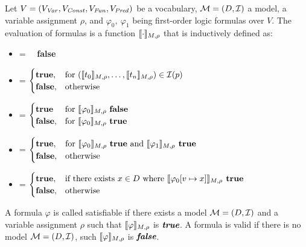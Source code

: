 \begin{mydef}
		Let $V = (V_{\mathit{Var}}, V_{\mathit{Const}}, V_{\mathit{Fun}}, V_{\mathit{Pred}})$ be a vocabulary, $\mathcal{M} = (D, \mathcal{I})$ a model, a variable assignment $\rho$, and $\varphi_0,\  \varphi_1$ being first-order logic formulas over $V$. The evaluation of formulas is a function $\llbracket \cdot \rrbracket_{M, \rho}$ that is inductively defined as: \\
		\begin{itemize}
			\item {\makebox[3.25cm]{$\eval{\bot} = \hfill$}} = \ \ \textbf{false}
			\item {} =
				$
				\begin{cases}
					\textbf{true}, & \text{for } (\llbracket t_0 \rrbracket_{M, \rho}, \ldots, \llbracket t_n \rrbracket_{M, \rho}) \in \mathcal{I}(p)\\
					\textbf{false}, & \text{otherwise}
				\end{cases}
				$
			\item {} =
				$
				\begin{cases}
					\textbf{true} & \text{for } \llbracket \varphi_0 \rrbracket_{M, \rho} \text{ \textbf{false}}\\
					\textbf{false}, & \text{for } \llbracket \varphi_0 \rrbracket_{M, \rho} \text{ \textbf{true}}\\
				\end{cases}
				$
			\item {} =
				$
				\begin{cases}
					\textbf{true}, & \text{for } \llbracket \varphi_0 \rrbracket_{M, \rho} \text{ \textbf{true} and } \llbracket \varphi_1 \rrbracket_{M, \rho} \textbf{ true} \\
					\textbf{false}, & \text{otherwise} \\
				\end{cases}
				$
			\item {} =
				$
				\begin{cases}
					\textbf{true}, & \text{if there exists } x \in D \text{ where } \llbracket \varphi_0 [v \mapsto x] \rrbracket_{M, \rho} \textbf{ true} \\
					\textbf{false}, & \text{otherwise} \\
				\end{cases}
				$
		\end{itemize}
\end{mydef}
A formula $\varphi$ is called satisfiable if there exists a model $\mathcal{M} = (D, \mathcal{I})$ and a variable assignment $\rho$ such that $\llbracket \varphi \rrbracket_{M, \rho}$ is $\textit{\textbf{true}}$. A formula is valid if there is no model $\mathcal{M} = (D, \mathcal{I})$, such $\llbracket \varphi \rrbracket_{M, \rho}$ is $\textit{\textbf{false}}$.
